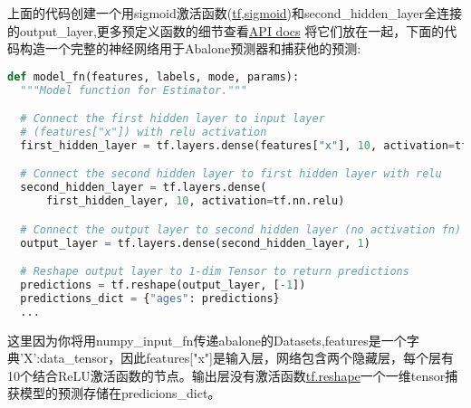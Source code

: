上面的代码创建一个用sigmoid激活函数(\href{https://www.tensorflow.org/api_docs/python/tf/sigmoid}{tf,sigmoid})和second\_hidden\_layer全连接的output\_layer,更多预定义函数的细节查看\href{https://www.tensorflow.org/api_guides/python/nn#activation_functions}{API docs}
将它们放在一起，下面的代码构造一个完整的神经网络用于Abalone预测器和捕获他的预测:
\begin{lstlisting}[language=Python]
def model_fn(features, labels, mode, params):
  """Model function for Estimator."""

  # Connect the first hidden layer to input layer
  # (features["x"]) with relu activation
  first_hidden_layer = tf.layers.dense(features["x"], 10, activation=tf.nn.relu)

  # Connect the second hidden layer to first hidden layer with relu
  second_hidden_layer = tf.layers.dense(
      first_hidden_layer, 10, activation=tf.nn.relu)

  # Connect the output layer to second hidden layer (no activation fn)
  output_layer = tf.layers.dense(second_hidden_layer, 1)

  # Reshape output layer to 1-dim Tensor to return predictions
  predictions = tf.reshape(output_layer, [-1])
  predictions_dict = {"ages": predictions}
  ...
\end{lstlisting}
这里因为你将用numpy\_input\_fn传递abalone的Datasets,features是一个字典{'X':data\_tensor}，因此features["x"]是输入层，网络包含两个隐藏层，每个层有10个结合ReLU激活函数的节点。输出层没有激活函数\href{https://www.tensorflow.org/api_docs/python/tf/reshape}{tf.reshape}一个一维tensor捕获模型的预测存储在predicions\_dict。
